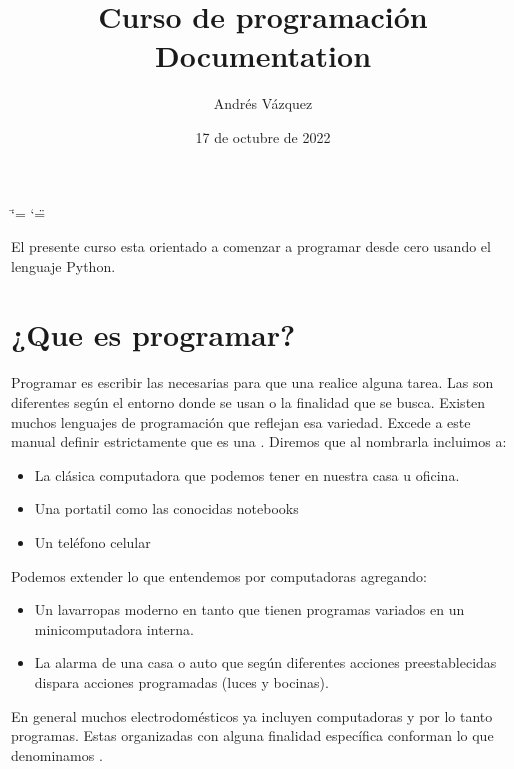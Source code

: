 \documentclass[a4paper,12pt,spanish]{sphinxmanual}
\title{Curso de programación Documentation}
\date{17 de octubre de 2022}
\author{Andrés Vázquez}
\begin{document}
\ifdefined\shorthandoff
  \ifnum\catcode`\=\string=\active\shorthandoff{=}\fi
  \ifnum\catcode`\"=\active{}\fi
\fi

\pagestyle{empty}
\sphinxmaketitle
\pagestyle{plain}
\sphinxtableofcontents
\pagestyle{normal}
\label{\detokenize{index::doc}}


\sphinxAtStartPar
El presente curso esta orientado a comenzar a programar desde cero usando el lenguaje Python.

\sphinxstepscope


\chapter{¿Que es programar?}
\label{\detokenize{que:que-es-programar}}\label{\detokenize{que::doc}}
\sphinxAtStartPar
Programar es escribir las  necesarias para que una  realice alguna tarea.
Las  son diferentes según el entorno donde se usan o la finalidad que se busca.
Existen muchos lenguajes de programación que reflejan esa variedad.
Excede a este manual definir estrictamente que es una . Diremos que al nombrarla incluimos a:
\begin{itemize}
\item {} 
\sphinxAtStartPar
La clásica computadora que podemos tener en nuestra casa u oficina.

\item {} 
\sphinxAtStartPar
Una portatil como las conocidas notebooks

\item {} 
\sphinxAtStartPar
Un teléfono celular

\end{itemize}

\sphinxAtStartPar
Podemos extender lo que entendemos por computadoras agregando:
\begin{itemize}
\item {} 
\sphinxAtStartPar
Un lavarropas moderno en tanto que tienen programas variados en un mini\sphinxhyphen{}computadora interna.

\item {} 
\sphinxAtStartPar
La alarma de una casa o auto que según diferentes acciones pre\sphinxhyphen{}establecidas dispara acciones programadas (luces y bocinas).

\end{itemize}

\sphinxAtStartPar
En general muchos electrodomésticos ya incluyen computadoras y por lo tanto programas.
Estas  organizadas con alguna finalidad específica conforman lo que denominamos .
\end{document}
